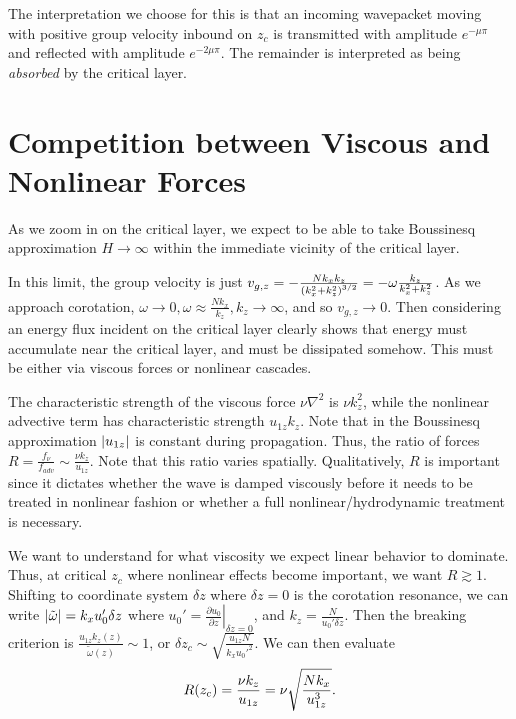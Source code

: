 \documentclass[11pt,
        usenames, %
        dvipsnames %
    ]{report}
\newcommand*{\pd}[2]{\frac{\partial#1}{\partial#2}}
\newcommand*{\at}[1]{\left.#1\right|}
\DeclarePairedDelimiter\abs{\lvert}{\rvert}
\DeclarePairedDelimiter\p{\lparen}{\rparen}
\begin{document}
The interpretation we choose for this is that an incoming wavepacket moving with
positive group velocity inbound on $z_c$ is transmitted with amplitude $e^{-\mu
\pi}$ and reflected with amplitude $e^{-2\mu \pi}$. The remainder is interpreted
as being \emph{absorbed} by the critical layer.

\section{Competition between Viscous and Nonlinear Forces}

As we zoom in on the critical layer, we expect to be able to take Boussinesq
approximation $H \to \infty$ within the immediate vicinity of the critical
layer.

In this limit, the group velocity is just $v_{g,z} = -\frac{Nk_xk_z}{\p*{k_x^2 +
k_z^2}^{3/2}} = -\omega\frac{k_z}{k_x^2 + k_z^2}$. As we approach corotation,
$\omega \to 0, \omega \approx \frac{Nk_x}{k_z}, k_z \to \infty$, and so $v_{g,
z} \to 0$. Then considering an energy flux incident on the critical layer
clearly shows that energy must accumulate near the critical layer, and must be
dissipated somehow. This must be either via viscous forces or nonlinear
cascades.

The characteristic strength of the viscous force $\nu \nabla^2$ is $\nu k_z^2$,
while the nonlinear advective term has characteristic strength $u_{1z}k_z$. Note
that in the Boussinesq approximation $\abs*{u_{1z}}$ is constant during
propagation. Thus, the ratio of forces $R = \frac{f_{\nu}}{f_{adv}} \sim
\frac{\nu k_z}{u_{1z}}$. Note that this ratio varies spatially. Qualitatively,
$R$ is important since it dictates whether the wave is damped viscously before
it needs to be treated in nonlinear fashion or whether a full
nonlinear/hydrodynamic treatment is necessary.

We want to understand for what viscosity we expect linear behavior to dominate.
Thus, at critical $z_{c}$ where nonlinear effects become important, we want $R
\gtrsim 1$. Shifting to coordinate system $\delta z$ where $\delta z = 0$ is the
corotation resonance, we can write $\abs*{\tilde{\omega}} = k_xu_0' \delta z$ where
$u_0' = \at{\pd{u_0}{z}}_{\delta z = 0}$, and $k_z = \frac{N}{u_0' \delta z}$.
Then the breaking criterion is $\frac{u_{1z}k_z(z)}{\tilde{\omega}(z)} \sim 1$, or
$\delta z_{c} \sim \sqrt{\frac{u_{1z}N}{k_xu_0'^2}}$. We can then evaluate
\begin{equation}
    R\p*{z_{c}} = \frac{\nu k_z}{u_{1z}} = \nu \sqrt{\frac{Nk_x}{u_{1z}^3}}.
\end{equation}
\end{document}
